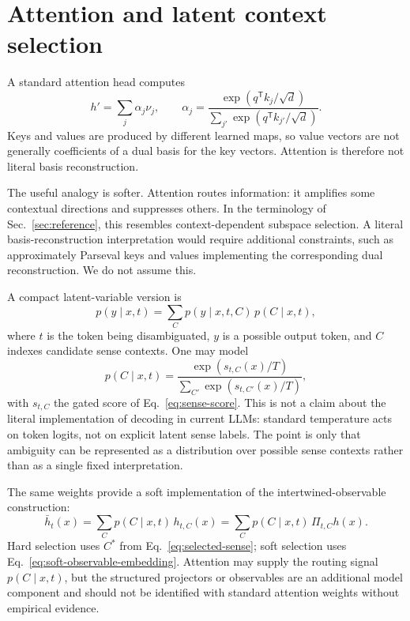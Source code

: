 \documentclass[
  aps,
  reprint,
  superscriptaddress,
  floatfix,
  nofootinbib,
  longbibliography
]{revtex4-2}
\newcommand{\T}{^{\mathsf{T}}}
\begin{document}
\section{Attention and latent context selection}
\label{sec:attention}

A standard attention head computes
%
\begin{equation}
\label{eq:attention}
h'=\sum_j\alpha_j\nu_j,
\qquad
\alpha_j=
\frac{\exp(q\T k_j/\sqrt d)}
{\sum_{j'}\exp(q\T k_{j'}/\sqrt d)} .
\end{equation}
%
Keys and values are produced by different learned maps, so value vectors
are not generally coefficients of a dual basis for the key vectors.
Attention is therefore not literal basis reconstruction.

The useful analogy is softer. Attention routes information: it amplifies
some contextual directions and suppresses others. In the terminology of
Sec.~\ref{sec:reference}, this resembles context-dependent subspace
selection. A literal basis-reconstruction interpretation would require
additional constraints, such as approximately Parseval keys and values
implementing the corresponding dual reconstruction. We do not assume this.

A compact latent-variable version is
%
\begin{equation}
\label{eq:latent}
p(y\mid x,t)=\sum_C p(y\mid x,t,C)\,p(C\mid x,t),
\end{equation}
%
where $t$ is the token being disambiguated, $y$ is a possible output token,
and $C$ indexes candidate sense contexts. One may model
%
\begin{equation}
\label{eq:context-temp}
p(C\mid x,t)=
\frac{\exp(s_{t,C}(x)/T)}
{\sum_{C'}\exp(s_{t,C'}(x)/T)} ,
\end{equation}
%
with $s_{t,C}$ the gated score of Eq.~\eqref{eq:sense-score}. This is not
a claim about the literal implementation of decoding in current LLMs:
standard temperature acts on token logits, not on explicit latent
sense labels. The point is only that ambiguity can be represented as a
distribution over possible sense contexts rather than as a single fixed
interpretation.

The same weights provide a soft implementation of the intertwined-observable
construction:
%
\begin{equation}
\label{eq:soft-observable-embedding}
\bar h_t(x)
=\sum_C p(C\mid x,t)\,h_{t,C}(x)
=\sum_C p(C\mid x,t)\,\Pi_{t,C}h(x).
\end{equation}
%
Hard selection uses $C^*$ from Eq.~\eqref{eq:selected-sense}; soft selection
uses Eq.~\eqref{eq:soft-observable-embedding}.  Attention may supply the
routing signal $p(C\mid x,t)$, but the structured projectors or observables
are an additional model component and should not be identified with standard
attention weights without empirical evidence.
\end{document}
